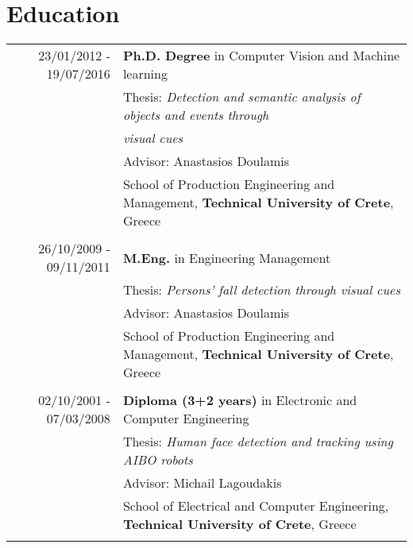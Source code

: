 \documentclass[a4paper,10pt]{article}
\begin{document}
\section{Education}
\begin{tabular}{r|p{11cm}}	
23/01/2012 - 19/07/2016 & \textbf{Ph.D. Degree} in Computer Vision and Machine learning \\
& Thesis: \textit{Detection and semantic analysis of objects and events through} \\
& \hspace{0.43 in} \textit{visual cues} \\
& Advisor: Anastasios Doulamis \\
& School of Production Engineering and Management, \textbf{Technical University of Crete}, Greece \\
\multicolumn{2}{c}{} \\		



26/10/2009 - 09/11/2011 & \textbf{M.Eng.} in Engineering Management \\
& Thesis: \textit{Persons' fall detection through visual cues} \\
& Advisor: Anastasios Doulamis \\
& School of Production Engineering and Management, \textbf{Technical University of Crete}, Greece \\
\multicolumn{2}{c}{} \\		

02/10/2001 - 07/03/2008 &\textbf{Diploma (3+2 years)} in Electronic and Computer Engineering \\
& Thesis: \textit{Human face detection and tracking using AIBO robots} \\
& Advisor: Michail Lagoudakis \\
& School of Electrical and Computer Engineering, \textbf{Technical University of Crete}, Greece \\
\multicolumn{2}{c}{} \\		
\end{tabular}
\end{document}
